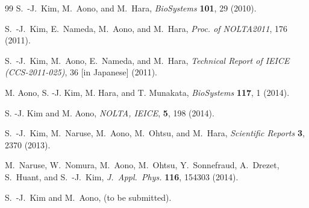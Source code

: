 \documentclass[twocolumn,showpacs,preprintnumbers,amsmath,amssymb]{revtex4}
\begin{document}
\begin{thebibliography}{99}
S.~-J.~Kim, M.~Aono, and M.~Hara, {\em BioSystems} {\bf 101}, 29 (2010).

S.~-J.~Kim, E.~Nameda, M.~Aono, and M.~Hara, {\em Proc. of NOLTA2011}, 176 (2011).

S.~-J.~Kim, M.~Aono, E.~Nameda, and M.~Hara, {\em Technical Report of IEICE (CCS-2011-025)}, 36 [in Japanese] (2011).


M. Aono, S. -J. Kim, M. Hara, and T. Munakata, {\em BioSystems} {\bf 117}, 1 (2014).

S. -J. Kim and M. Aono, {\em NOLTA, IEICE}, {\bf 5}, 198 (2014).


S.~-J.~Kim, M.~Naruse, M.~Aono, M.~Ohtsu, and M.~Hara, {\em Scientific Reports} {\bf 3}, 2370 (2013).

M.~Naruse, W.~Nomura, M.~Aono, M.~Ohtsu, Y.~Sonnefraud, A.~Drezet, S.~Huant, and S.~-J.~Kim, {\em J.~Appl.~Phys.} {\bf 116}, 154303 (2014).

S.~-J.~Kim and M.~Aono, (to be submitted).

\end{thebibliography}
\end{document}
